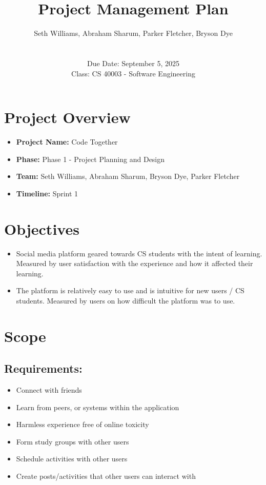 \documentclass[10pt,titlepage]{article}
\title{Project Management Plan}
\author{Seth Williams, Abraham Sharum, Parker Fletcher, Bryson Dye \\\\ \\ Due Date: September 5, 2025 \\ Class: CS 40003 - Software Engineering}
\begin{document}
	\pagestyle{fancy}
	\fancyhead{}
	\fancyfoot{}
	\fancyfoot[CE,CO]{\textbf{\thepage}}
	\maketitle
	
	\section*{Project Overview}
	\begin{itemize}
		\item \textbf{Project Name:} Code Together
		\item \textbf{Phase:} Phase 1 - Project Planning and Design
		\item \textbf{Team:} Seth Williams, Abraham Sharum, Bryson Dye, Parker Fletcher
		\item \textbf{Timeline:} Sprint 1
	\end{itemize}
	
	\section*{Objectives}
	\begin{itemize}
		\item Social media platform geared towards CS students with the intent of learning. Measured by user satisfaction with the experience and how it affected their learning.
		\item The platform is relatively easy to use and is intuitive for new users / CS students. Measured by users on how difficult the platform was to use. 
	\end{itemize}
	
	\section*{Scope}
	
	\subsection*{Requirements:}
	
	\begin{itemize} 
		\item Connect with friends
		\item Learn from peers, or systems within the application
		\item Harmless experience free of online toxicity 
		\item Form study groups with other users
		\item Schedule activities with other users
        \item Create posts/activities that other users can interact with
	\end{itemize}
	
\end{document}
